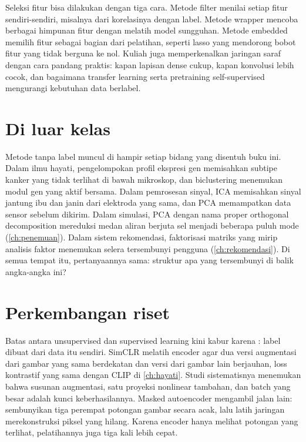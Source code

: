 Seleksi fitur bisa dilakukan dengan tiga cara. Metode filter menilai setiap fitur sendiri-sendiri,
misalnya dari korelasinya dengan label. Metode wrapper mencoba berbagai himpunan fitur dengan
melatih model sungguhan. Metode embedded memilih fitur sebagai bagian dari pelatihan, seperti lasso
yang mendorong bobot fitur yang tidak berguna ke nol. Kuliah juga memperkenalkan jaringan saraf
dengan cara pandang praktis: kapan lapisan dense cukup, kapan konvolusi lebih cocok, dan bagaimana
transfer learning serta pretraining self-supervised mengurangi kebutuhan data berlabel.

\section{Di luar kelas}

Metode tanpa label muncul di hampir setiap bidang yang disentuh buku ini. Dalam ilmu hayati,
pengelompokan profil ekspresi gen memisahkan subtipe kanker yang tidak terlihat di bawah
mikroskop, dan biclustering menemukan modul gen yang aktif bersama. Dalam pemrosesan sinyal, ICA
memisahkan sinyal jantung ibu dan janin dari elektroda yang sama, dan PCA memampatkan data sensor
sebelum dikirim. Dalam simulasi, PCA dengan nama proper orthogonal decomposition mereduksi medan
aliran berjuta sel menjadi beberapa puluh mode (\cref{ch:penemuan}). Dalam sistem rekomendasi,
faktorisasi matriks yang mirip analisis faktor menemukan selera tersembunyi pengguna
(\cref{ch:rekomendasi}). Di semua tempat itu, pertanyaannya sama: struktur apa yang tersembunyi di
balik angka-angka ini?

\section{Perkembangan riset}

Batas antara unsupervised dan supervised learning kini kabur karena : label dibuat dari
data itu sendiri. SimCLR \citep{chen2020simclr} melatih encoder agar dua versi augmentasi dari gambar yang sama berdekatan
dan versi dari gambar lain berjauhan, loss kontrastif yang sama dengan CLIP di \cref{ch:hayati}. Studi sistematisnya
menemukan bahwa susunan augmentasi, satu proyeksi nonlinear tambahan, dan batch yang besar adalah kunci keberhasilannya.
Masked autoencoder \citep{he2022mae} mengambil jalan lain: sembunyikan tiga perempat potongan gambar secara acak, lalu
latih jaringan merekonstruksi piksel yang hilang. Karena encoder hanya melihat potongan yang terlihat, pelatihannya juga
tiga kali lebih cepat.

